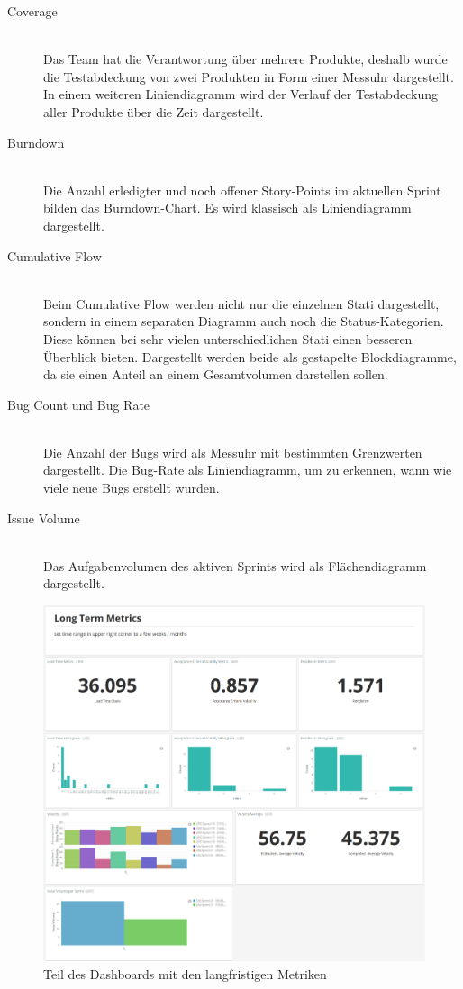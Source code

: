 \clearpage
\begin{description}
    \item[Coverage] \hfill \\ Das Team hat die Verantwortung über mehrere Produkte, deshalb wurde die Testabdeckung von zwei Produkten in Form einer Messuhr dargestellt. In einem weiteren Liniendiagramm wird der Verlauf der Testabdeckung aller Produkte über die Zeit dargestellt.
    \item[Burndown] \hfill \\ Die Anzahl erledigter und noch offener Story-Points im aktuellen Sprint bilden das Burndown-Chart. Es wird klassisch als Liniendiagramm dargestellt.
    \item[Cumulative Flow] \hfill \\ Beim Cumulative Flow werden nicht nur die einzelnen Stati dargestellt, sondern in einem separaten Diagramm auch noch die Status-Kategorien. Diese können bei sehr vielen unterschiedlichen Stati einen besseren Überblick bieten. Dargestellt werden beide als gestapelte Blockdiagramme, da sie einen Anteil an einem Gesamtvolumen darstellen sollen.
    \item[Bug Count und Bug Rate] \hfill \\ Die Anzahl der Bugs wird als Messuhr mit bestimmten Grenzwerten dargestellt. Die Bug-Rate als Liniendiagramm, um zu erkennen, wann wie viele neue Bugs erstellt wurden.
    \item[Issue Volume] \hfill \\ Das Aufgabenvolumen des aktiven Sprints wird als Flächendiagramm dargestellt.
\end{description}

\begin{savenotes}
    \begin{figure}[H] 
        \centering
            \includegraphics[width=1.0\textwidth]{img/dashboard-long-term.png}
        \caption{Teil des Dashboards mit den langfristigen Metriken}\label{fig:dashboard-long-term}
    \end{figure}
\end{savenotes}

